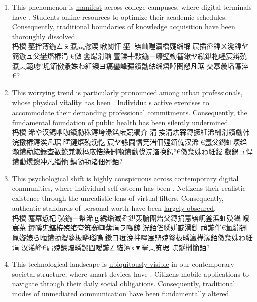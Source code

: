 ﻿\documentclass[lang=cn,11pt]{elegantbook}
\begin{document}
\begin{enumerate}
\item This phenomenon is \underline{manifest} across college campuses, where digital terminals have . Students  online resources to optimize their academic schedules. Consequently, traditional boundaries of knowledge acquisition have been \underline{thoroughly dissolved}.\\杩欑鐜拌薄鍦ㄥぇ瀛︽牎鍥噷闅忓鍙锛屾暟瀛楀寲缁堢宸插畬鍏ㄨ瀺鍏ヤ簡鏃ュ父鐢熸椿涓€傚鐢熶滑鏅亶鍒╃敤鍦ㄧ嚎璧勬簮鏉ヤ紭鍖栬嚜宸辩殑瀛︿範璁″垝銆傚洜姝わ紝鐭ヨ瘑鑾峰彇鐨勪紶缁熺晫闄愬凡琚交搴曟墦鐮淬€?
\item This worrying trend is \underline{particularly pronounced} among urban professionals, whose physical vitality has been . Individuals  active exercises to accommodate their demanding professional commitments. Consequently, the fundamental foundation of public health has been \underline{silently undermined}.\\
杩欑浠や汉鎷呭咖鐨勮秼鍔垮湪鍩庡競鐧介涓挨涓烘槑鏄撅紝浠栦滑鐨勮韩浣撴椿鍔涘凡琚暱鏈熺殑浼忔宸ヤ綔閫愭笎渚佃殌銆備汉浠€氬父鐗虹壊绉瀬鐨勪綋鑲查敾鐐兼潵杩庡悎绻侀噸鐨勫伐浣滀换鍔°€傚洜姝わ紝鍏叡鍋ュ悍鐨勫熀鐭冲凡缁忚鎮勭劧渚佃殌銆?
\item This psychological shift is \underline{highly conspicuous} across contemporary digital communities, where individual self-esteem has been . Netizens  their realistic existence through the unrealistic lens of virtual filters. Consequently, authentic standards of personal worth have been \underline{largely obscured}.\\
杩欑蹇冪悊杞彉鍦ㄧ幇浠ｇ綉缁滅ぞ鍖轰腑闈炲父鏄捐憲锛屼釜浜虹殑鑷皧宸茶鐞嗘兂鍖栫殑绾夸笂褰㈣薄涓ラ噸鎵洸銆傜綉姘戜滑鏈兘鍦伴€氳繃铏氭嫙婊ら暅鐨勯潪鐜板疄瑙嗚鏉ヨ瘎浼拌嚜宸辩殑鐜板疄瀛樺湪銆傚洜姝わ紝涓汉浠峰€肩殑鐪熷疄鏍囧噯鍦ㄥ緢澶х▼搴︿笂琚帺鐩栦簡銆?
\item This technological landscape is \underline{ubiquitously visible} in our contemporary societal structure, where smart devices have . Citizens  mobile applications to navigate through their daily social obligations. Consequently, traditional modes of unmediated communication have been \underline{fundamentally altered}.\\

\end{enumerate}
\end{document}
